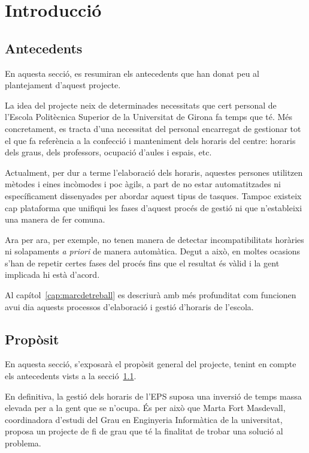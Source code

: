 \documentclass[a4paper,12pt]{ThesisStyle}
\begin{document}
\mainmatter

\chapter{Introducció}
\label{cap:intro}

\section{Antecedents}
\label{sec:antecedents}

En aquesta secció, es resumiran els antecedents que han donat peu al plantejament d'aquest projecte.

La idea del projecte neix de determinades necessitats que cert personal de l'Escola Politècnica Superior de la Universitat de Girona fa temps que té. Més concretament, es tracta d'una necessitat del personal encarregat de gestionar tot el que fa referència a la confecció i manteniment dels horaris del centre: horaris dels graus, dels professors, ocupació d'aules i espais, etc.

Actualment, per dur a terme l'elaboració dels horaris, aquestes persones utilitzen mètodes i eines incòmodes i poc àgils, a part de no estar automatitzades ni específicament dissenyades per abordar aquest tipus de tasques. Tampoc existeix cap plataforma que unifiqui les fases d'aquest procés de gestió ni que n'estableixi una manera de fer comuna.

Ara per ara, per exemple, no tenen manera de detectar incompatibilitats horàries ni solapaments \textit{a priori} de manera automàtica. Degut a això, en moltes ocasions s'han de repetir certes fases del procés fins que el resultat és vàlid i la gent implicada hi està d'acord.

Al capítol~\ref{cap:marcdetreball} es descriurà amb més profunditat com funcionen avui dia aquests processos d'elaboració i gestió d'horaris de l'escola.

\section{Propòsit}
\label{sec:proposit}

En aquesta secció, s'exposarà el propòsit general del projecte, tenint en compte els antecedents vists a la secció~\ref{sec:antecedents}.

En definitiva, la gestió dels horaris de l'EPS suposa una inversió de temps massa elevada per a la gent que se n'ocupa. És per això que Marta Fort Masdevall, coordinadora d'estudi del Grau en Enginyeria Informàtica de la universitat, proposa un projecte de fi de grau que té la finalitat de trobar una solució al problema.
\end{document}
